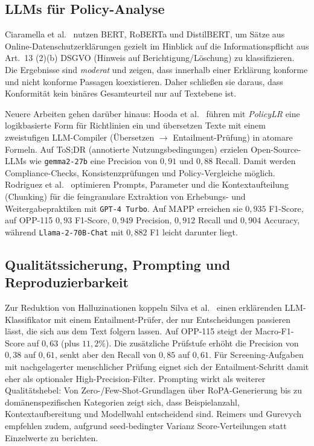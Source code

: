 \subsection*{\acp{LLM} für Policy-Analyse}

Ciaramella et al.\ \cite{ciaramella2022leveraging} nutzen BERT, RoBERTa und DistilBERT, um Sätze aus Online-Datenschutzerklärungen gezielt im Hinblick auf die Informationspflicht aus Art.~13 (2)(b) \ac{DSGVO} (Hinweis auf Berichtigung/Löschung) zu klassifizieren. Die Ergebnisse sind \emph{moderat} und zeigen, dass innerhalb einer Erklärung konforme und nicht konforme Passagen koexistieren. Daher schließen sie daraus, dass Konformität kein binäres Gesamteurteil nur auf Textebene ist.

Neuere Arbeiten gehen darüber hinaus: Hooda et al.\ \cite{hooda2024policylr} führen mit \emph{PolicyLR} eine logikbasierte Form für Richtlinien ein und übersetzen Texte mit einem zweistufigen \ac{LLM}-Compiler (Übersetzen $\to$ Entailment-Prüfung) in atomare Formeln. Auf ToS;DR (annotierte Nutzungsbedingungen) erzielen Open-Source-\acp{LLM} wie \texttt{gemma2-27b} eine Precision von $0{,}91$ und $0{,}88$ Recall. Damit werden Compliance-Checks, Konsistenzprüfungen und Policy-Vergleiche möglich. Rodriguez et al.\ \cite{rodriguez2024largelanguagemodels} optimieren Prompts, Parameter und die Kontextaufteilung (Chunking) für die feingranulare Extraktion von Erhebungs- und Weitergabepraktiken mit \texttt{GPT-4~Turbo}. Auf MAPP erreichen sie $0{,}935$ F1-Score, auf OPP-115 $0{,}93$ F1-Score, $0{,}949$ Precision, $0{,}912$ Recall und $0{,}904$ Accuracy, während \texttt{Llama-2-70B-Chat} mit $0{,}882$ F1 leicht darunter liegt.

\subsection*{Qualitätssicherung, Prompting und Reproduzierbarkeit}

Zur Reduktion von Halluzinationen koppeln Silva et al.\ \cite{silva2024entailment} einen erklärenden \ac{LLM}-Klassifikator mit einem Entailment-Prüfer, der nur Entscheidungen passieren lässt, die sich aus dem Text folgern lassen. Auf OPP-115 steigt der Macro-F1-Score auf $0{,}63$ (plus $11{,}2$\%). Die zusätzliche Prüfstufe erhöht die Precision von $0{,}38$ auf $0{,}61$, senkt aber den Recall von $0{,}85$ auf $0{,}61$. Für Screening-Aufgaben mit nachgelagerter menschlicher Prüfung eignet sich der Entailment-Schritt damit eher als optionaler High-Precision-Filter. Prompting wirkt als weiterer Qualitätshebel: Von Zero-/Few-Shot-Grundlagen \cite{brown2020fewshot,liu2023prompting} über RoPA-Generierung \cite{pragyan2024toward} bis zu domänenspezifischen Kategorien \cite{schwerin2024systematic} zeigt sich, dass Beispielanzahl, Kontextaufbereitung und Modellwahl entscheidend sind. Reimers und Gurevych \cite{reimers2017reporting} empfehlen zudem, aufgrund seed-bedingter Varianz Score-Verteilungen statt Einzelwerte zu berichten.

